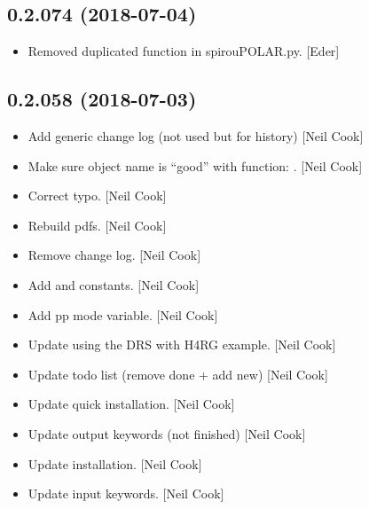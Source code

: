 \documentclass[a4paper,10pt,english]{report}
\begin{document}
\subsection{0.2.074 (2018-07-04)}
\label{\detokenize{misc/changelog:id402}}\begin{itemize}
\item {} 
Removed duplicated function  in spirouPOLAR.py.
{[}Eder{]}

\end{itemize}


\subsection{0.2.058 (2018-07-03)}
\label{\detokenize{misc/changelog:id403}}\begin{itemize}
\item {} 
Add generic change log (not used but for history) {[}Neil Cook{]}

\item {} 
Make sure object name is “good” with function: .
{[}Neil Cook{]}

\item {} 
Correct typo. {[}Neil Cook{]}

\item {} 
Rebuild pdfs. {[}Neil Cook{]}

\item {} 
Remove change log. {[}Neil Cook{]}

\item {} 
Add  and  constants. {[}Neil Cook{]}

\item {} 
Add pp mode variable. {[}Neil Cook{]}

\item {} 
Update using the DRS with H4RG example. {[}Neil Cook{]}

\item {} 
Update todo list (remove done + add new) {[}Neil Cook{]}

\item {} 
Update quick installation. {[}Neil Cook{]}

\item {} 
Update output keywords (not finished) {[}Neil Cook{]}

\item {} 
Update installation. {[}Neil Cook{]}

\item {} 
Update input keywords. {[}Neil Cook{]}


\end{itemize}
\end{document}
